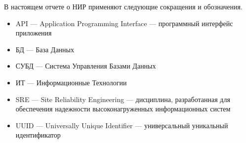 
В настоящем отчете о НИР применяют следующие сокращения и обозначения.

\begin{itemize}
    \item API --- Application Programming Interface --- программный интерфейс приложения
    \item БД --- База Данных
    \item СУБД --- Система Управления Базами Данных
    \item ИТ --- Информационные Технологии
    \item SRE --- Site Reliability Engineering --- дисциплина, разработанная для 
    обеспечения надежности высоконагруженных информационных систем
    \item UUID --- Universally Unique Identifier --- универсальный уникальный идентификатор
\end{itemize}